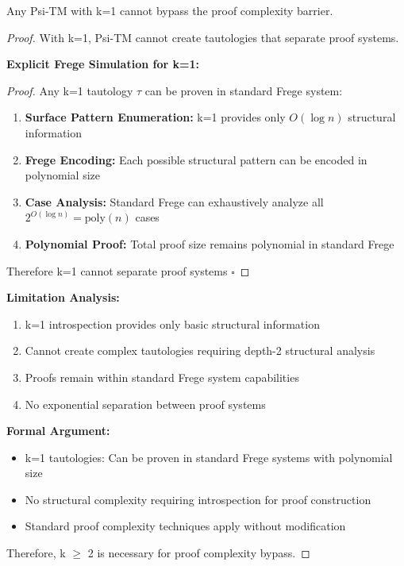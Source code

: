\documentclass[11pt]{article}
\newcommand{\qed}{\hfill$\square$}
\begin{document}
\begin{theorem}
\label{thm:proof-complexity-k1}
Any Psi-TM with k=1 cannot bypass the proof complexity barrier.
\end{theorem}

\begin{proof}
With k=1, Psi-TM cannot create tautologies that separate proof systems.

\textbf{Explicit Frege Simulation for k=1:}
\begin{proof}
Any k=1 tautology $\tau$ can be proven in standard Frege system:
\begin{enumerate}
\item \textbf{Surface Pattern Enumeration:} k=1 provides only $O(\log n)$ structural information
\item \textbf{Frege Encoding:} Each possible structural pattern can be encoded in polynomial size
\item \textbf{Case Analysis:} Standard Frege can exhaustively analyze all $2^{O(\log n)} = \text{poly}(n)$ cases
\item \textbf{Polynomial Proof:} Total proof size remains polynomial in standard Frege
\end{enumerate}
Therefore k=1 cannot separate proof systems \qed
\end{proof}

\textbf{Limitation Analysis:}
\begin{enumerate}
\item k=1 introspection provides only basic structural information
\item Cannot create complex tautologies requiring depth-2 structural analysis
\item Proofs remain within standard Frege system capabilities
\item No exponential separation between proof systems
\end{enumerate}

\textbf{Formal Argument:}
\begin{itemize}
\item k=1 tautologies: Can be proven in standard Frege systems with polynomial size
\item No structural complexity requiring introspection for proof construction
\item Standard proof complexity techniques apply without modification
\end{itemize}

Therefore, k $\geq$ 2 is necessary for proof complexity bypass.
\end{proof}
\end{document}

